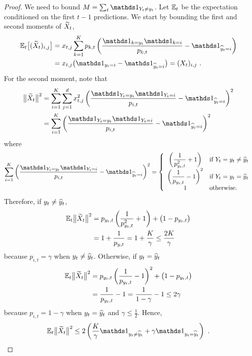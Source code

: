 \begin{proof}
We need to bound $M = \sum_t \ds1_{Y_t \neq y_t}$. Let $\mathbb{E}_t$ be the expectation conditioned on the first $t-1$ predictions. We start by bounding the first and second moments of $\widetilde{X}_t$,
\begin{align*}
    \E_t\bigl[(\tX_t)_{i,j}\bigr]
&=
    x_{t,j}\sum_{k=1}^K p_{k,t}\left(\frac{\ds1_{k = y_t}\ds1_{k = i}}{p_{k,t}} - \ds1_{\yhat_t = i}\right)
\\ &=
    x_{t,j}\bigl(\ds1_{y_t=i} - \ds1_{\yhat_t=i}\bigr) = (X_t)_{i,j}~.
\end{align*}
For the second moment, note that
\begin{align*}
    \bigl\|\tX_t\bigr\|^2
&=
    \sum_{i=1}^K\sum_{j=1}^d x_{t,j}^2\left(\frac{\ds1_{Y_t = y_t}\ds1_{Y_t = i}}{p_{i,t}} - \ds1_{\yhat_t = i}\right)^2
\\ &=
    \sum_{i=1}^K\left(\frac{\ds1_{Y_t = y_t}\ds1_{Y_t = i}}{p_{i,t}} - \ds1_{\yhat_t = i}\right)^2
\end{align*}
where
\[
    \sum_{i=1}^K\left(\frac{\ds1_{Y_t = y_t}\ds1_{Y_t = i}}{p_{i,t}} - \ds1_{\yhat_t = i}\right)^2
=
    \left\{ \begin{array}{cl}
    {\dt \left(\frac{1}{p_{y_t,t}^2} + 1\right) } & \text{if $Y_t = y_t \neq \yhat_t$}
\\[2mm]
    {\dt \left(\frac{1}{p_{y_t,t}} - 1\right)^2 } & \text{if $Y_t = y_t = \yhat_t$}
\\[2mm]
    1 & \text{otherwise.}
    \end{array} \right.
\]
Therefore, if $y_t \neq \widehat{y}_t$,
\begin{align*}
    \mathbb{E}_t\bigl\|\widetilde{X}_t\bigr\|^2
&=
    p_{y_t,t}\left(\frac{1}{p_{y_t,t}^2} + 1\right) + \bigl(1-p_{y_t,t}\bigr)
\\&=
    1 + \frac{1}{p_{y,t}}
=
    1 + \frac{K}{\gamma}
\le
    \frac{2K}{\gamma}
\end{align*}
because $p_{i,t} = \gamma$ when $y_t \neq \widehat{y}_t$.
Otherwise, if $y_t = \widehat{y}_t$
\begin{align*}
    \mathbb{E}_t\bigl\|\widetilde{X}_t\bigr\|^2
&=
    p_{y_t,t}\left(\frac{1}{p_{y_t,t}} - 1\right)^2 + \bigl(1-p_{y_t,t}\bigr)
\\&=
    \frac{1}{p_{y_t,t}} - 1
=
    \frac{1}{1-\gamma} - 1
\le
    2\gamma
\end{align*}
because $p_{i,t} = 1-\gamma$ when $y_t = \widehat{y}_t$ and $\gamma \le \tfrac{1}{2}$.
Hence,
\[
    \E_t\bigl\|\tX_t\bigr\|^2
\le
    2\left(\frac{K}{\gamma}\ds1_{y_t \neq \yhat_t} + \gamma\ds1_{y_t = \yhat_t}\right)~.
\]

\end{proof}
